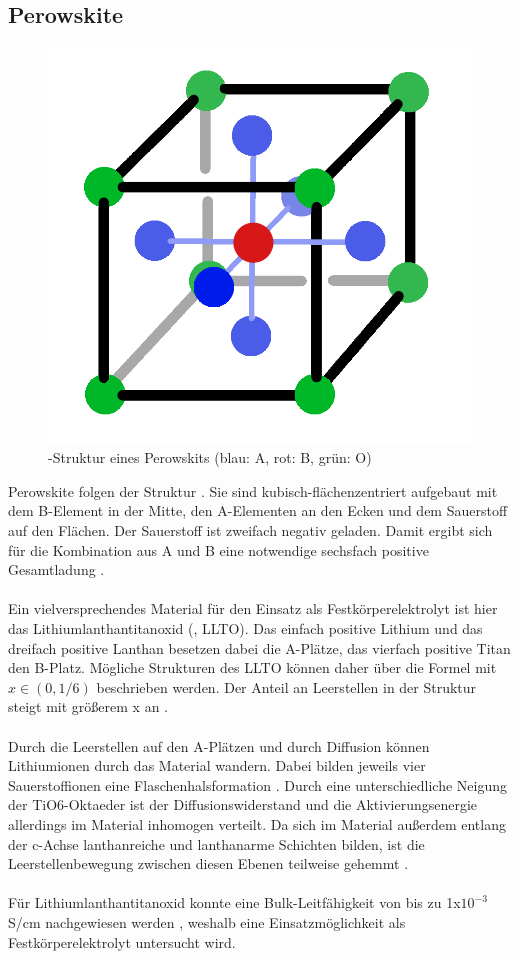\documentclass[a4paper, 11pt, headsepline,footsepline,twoside,abstract]{scrbook}
\begin{document}
\subsection{Perowskite}
\begin{figure}
	\centering
	\includegraphics[width=0.5\columnwidth]{images/Perowskit-Struktur.png}
	\caption{-Struktur eines Perowskits (blau: A, rot: B, grün: O)}
	\label{struktur-perowskit}
\end{figure}
Perowskite folgen der Struktur . Sie sind kubisch-flächenzentriert aufgebaut mit dem B-Element in der Mitte, den A-Elementen an den Ecken und dem Sauerstoff auf den Flächen. Der Sauerstoff ist zweifach negativ geladen. Damit ergibt sich für die Kombination aus A und B eine notwendige sechsfach positive Gesamtladung \cite{ishihara2009perovskite}.
\\\\
Ein vielversprechendes Material für den Einsatz als Festkörperelektrolyt ist hier das Lithiumlanthantitanoxid (, LLTO). Das einfach positive Lithium und das dreifach positive Lanthan besetzen dabei die A-Plätze, das vierfach positive Titan den B-Platz. Mögliche Strukturen des LLTO können daher über die Formel  mit $x \in (0, 1/6)$ beschrieben werden. Der Anteil an Leerstellen in der Struktur steigt mit größerem x an \cite{chen2015lithium}.
\\\\
Durch die Leerstellen auf den A-Plätzen und durch Diffusion können Lithiumionen durch das Material wandern. Dabei bilden jeweils vier Sauerstoffionen eine Flaschenhalsformation \cite{cao2014recent}. Durch eine unterschiedliche Neigung der TiO6-Oktaeder ist der Diffusionswiderstand und die Aktivierungsenergie allerdings im Material inhomogen verteilt. Da sich im Material außerdem entlang der c-Achse lanthanreiche und lanthanarme Schichten bilden, ist die Leerstellenbewegung zwischen diesen Ebenen teilweise gehemmt \cite{jay2015genetics}.
\\\\
Für Lithiumlanthantitanoxid konnte eine Bulk-Leitfähigkeit von bis zu 1x$10^{-3}$ S/cm nachgewiesen werden \cite{stramare2003lithium}, weshalb eine Einsatzmöglichkeit als Festkörperelektrolyt untersucht wird.
\end{document}
